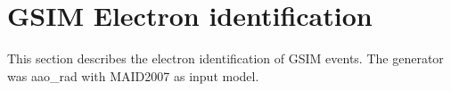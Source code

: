 \clearpage\newpage
\section{GSIM Electron identification}
This section describes the electron identification of GSIM events. The generator was aao\_rad with MAID2007 as input model.

